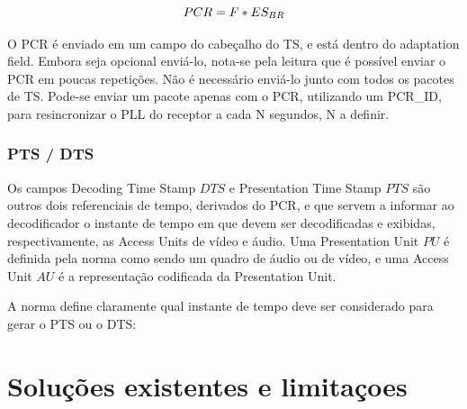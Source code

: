 \documentclass[
	12pt,				%
	openright,			%
	twoside,			%
	a4paper,			%
	brazil,
	french,				%
	english
	]{abntex2}
\begin{document}
\begin{equation}
$$ PCR = F*ES_{BR}  $$
\end{equation}

O PCR é enviado em  um campo do cabeçalho do TS, e está dentro do adaptation field. Embora seja opcional enviá-lo,
nota-se pela leitura que é possível enviar o PCR em poucas repetições. Não é necessário enviá-lo junto
com todos os pacotes de TS. Pode-se enviar um pacote apenas com o PCR, utilizando um PCR\_ID, para resincronizar o
PLL do receptor a cada N segundos, N a definir.


\subsection{PTS / DTS}

Os campos Decoding Time Stamp \(DTS\) e Presentation Time Stamp \(PTS\) são outros dois referenciais de tempo,
derivados do PCR, e que servem a informar ao decodificador o instante de tempo em que devem ser decodificadas
e exibidas, respectivamente, as Access Units de vídeo e áudio. Uma Presentation Unit \(PU\) é definida pela
norma como sendo um quadro de áudio ou de vídeo, e uma Access Unit \(AU\) é a representação codificada 
da Presentation Unit.

A norma define claramente qual instante de tempo deve ser considerado para gerar o PTS ou o DTS:


\chapter{Soluções existentes e limitaçoes}
\end{document}
